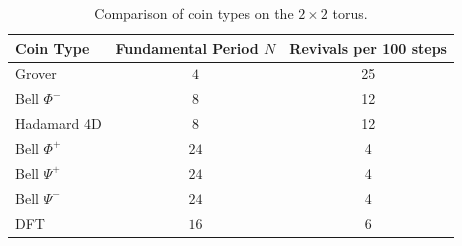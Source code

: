 \begin{table}[H]
\centering
\caption{Comparison of coin types on the $2 \times 2$ torus.}
\label{tab:all-coins}
\begin{tabular}{lcc}
\toprule
\textbf{Coin Type} & \textbf{Fundamental Period $N$} & \textbf{Revivals per 100 steps} \\
\midrule
Grover & $4$ & 25 \\
Bell $\Phi^-$ & $8$ & 12 \\
Hadamard 4D & $8$ & 12 \\
Bell $\Phi^+$ & $24$ & 4 \\
Bell $\Psi^+$ & $24$ & 4 \\
Bell $\Psi^-$ & $24$ & 4 \\
DFT & $16$ & 6 \\
\bottomrule
\end{tabular}
\end{table}
